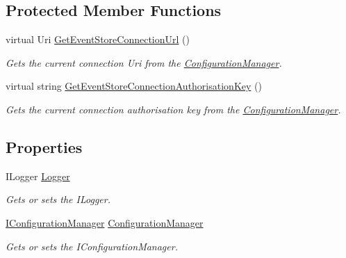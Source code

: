 \subsection*{Protected Member Functions}
\begin{DoxyCompactItemize}
\item 
virtual Uri \hyperlink{classCqrs_1_1Azure_1_1DocumentDb_1_1Events_1_1AzureDocumentDbEventStoreConnectionStringFactory_a53d282392000624128304c6477a2a466_a53d282392000624128304c6477a2a466}{Get\+Event\+Store\+Connection\+Url} ()
\begin{DoxyCompactList}\small\item\em Gets the current connection Uri from the \hyperlink{namespaceCqrs_1_1Azure_1_1ConfigurationManager}{Configuration\+Manager}. \end{DoxyCompactList}\item 
virtual string \hyperlink{classCqrs_1_1Azure_1_1DocumentDb_1_1Events_1_1AzureDocumentDbEventStoreConnectionStringFactory_aa16b2178e1ca8893c120097f6dd47022_aa16b2178e1ca8893c120097f6dd47022}{Get\+Event\+Store\+Connection\+Authorisation\+Key} ()
\begin{DoxyCompactList}\small\item\em Gets the current connection authorisation key from the \hyperlink{namespaceCqrs_1_1Azure_1_1ConfigurationManager}{Configuration\+Manager}. \end{DoxyCompactList}\end{DoxyCompactItemize}
\subsection*{Properties}
\begin{DoxyCompactItemize}
\item 
I\+Logger \hyperlink{classCqrs_1_1Azure_1_1DocumentDb_1_1Events_1_1AzureDocumentDbEventStoreConnectionStringFactory_a5512879778ae56a8ee26baf52be1cdd3_a5512879778ae56a8ee26baf52be1cdd3}{Logger}
\begin{DoxyCompactList}\small\item\em Gets or sets the I\+Logger. \end{DoxyCompactList}\item 
\hyperlink{interfaceCqrs_1_1Configuration_1_1IConfigurationManager}{I\+Configuration\+Manager} \hyperlink{classCqrs_1_1Azure_1_1DocumentDb_1_1Events_1_1AzureDocumentDbEventStoreConnectionStringFactory_a17abd52e82be8c2dea8f5ef5edb53b85_a17abd52e82be8c2dea8f5ef5edb53b85}{Configuration\+Manager}
\begin{DoxyCompactList}\small\item\em Gets or sets the I\+Configuration\+Manager. \end{DoxyCompactList}\end{DoxyCompactItemize}


